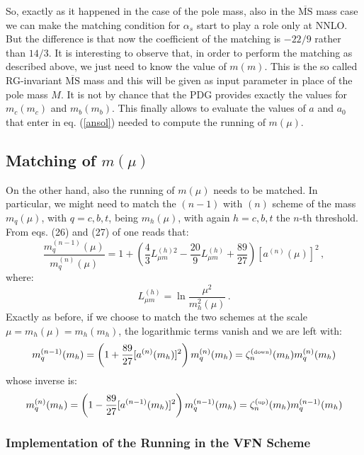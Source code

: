 \documentclass[10pt,a4paper]{article}
\begin{document}
So, exactly as it happened in the case of the pole mass, also in the $\overline{\mbox{MS}}$ mass case we can make the matching condition for $\alpha_s$ start to play a role only at NNLO. But the difference is that now the coefficient of the matching is $-22/9$ rather than $14/3$. It is interesting to observe that, in order to perform the matching as described above, we just need to know the value of $m(m)$. This is the so called RG-invariant $\overline{\mbox{MS}}$ mass and this will be given as input parameter in place of the pole mass $M$. It is not by chance that the PDG provides exactly the values for $m_c(m_c)$ and $m_b(m_b)$. This finally allows to evaluate the values of $a$ and $a_0$ that enter in eq. (\ref{ansol}) needed to compute the running of $m(\mu)$. 

\subsection{Matching of $m(\mu)$}

On the other hand, also the running of $m(\mu)$ needs to be matched. In particular, we might need to match the $(n-1)$ with $(n)$ scheme of the mass $m_q(\mu)$, with $q=c,b,t$, being $m_h(\mu)$, with again $h=c,b,t$ the $n$-th threshold. From eqs. (26) and (27) of \cite{Chetyrkin:2000yt} one reads that:
\begin{equation}\label{mqmc}
\frac{m_q^{(n-1)}(\mu)}{m_q^{(n)}(\mu)}=1+\left(\frac43L_{\mu m}^{(h)2}-\frac{20}9L_{\mu m}^{(h)}+\frac{89}{27}\right)[a^{(n)}(\mu)]^2\,,
\end{equation}
where:
\begin{equation}
L_{\mu m}^{(h)} =\ln\frac{\mu^2}{m_h^2(\mu)}\,.
\end{equation}
Exactly as before, if we choose to match the two schemes at the scale $\mu=m_h(\mu)=m_h(m_h)$, the logarithmic terms vanish and we are left with:
\begin{equation}
m_q^{(n-1)}(m_h)=\left(1+\frac{89}{27}[a^{(n)}(m_h)]^2\right)m_q^{(n)}(m_h)=\zeta_n^{(\mbox{\tiny down})}(m_h)m_q^{(n)}(m_h)
\end{equation}
whose inverse is:
\begin{equation}
m_q^{(n)}(m_h)=\left(1-\frac{89}{27}[a^{(n-1)}(m_h)]^2\right)m_q^{(n-1)}(m_h)=\zeta_n^{(\mbox{\tiny up})}(m_h)m_q^{(n-1)}(m_h)
\end{equation}

\subsubsection{Implementation of the Running in the VFN Scheme}
\end{document}
